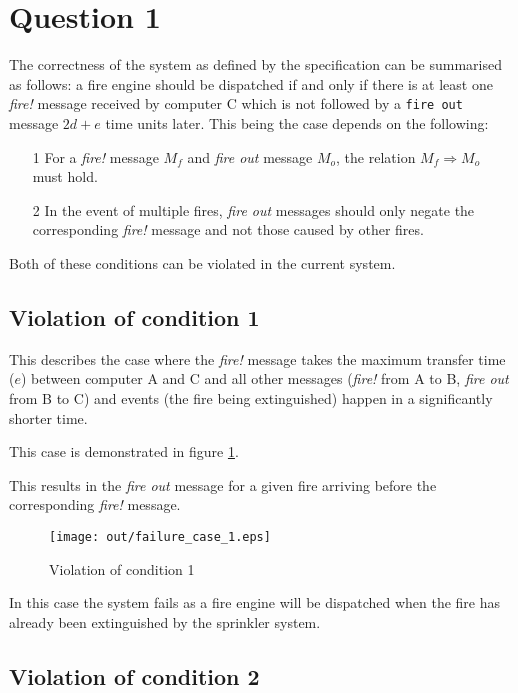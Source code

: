 \documentclass[twocolumn]{article}
\title{\DOCTITLE}
\author{\DOCAUTHOR}
\date{\DOCDATE}
\begin{document}
\section{Question 1}

The correctness of the system as defined by the specification can be summarised
as follows: a fire engine should be dispatched if and only if there is at least
one \textit{fire!} message received by computer C which is not followed by a
\texttt{fire out} message $2d + e$ time units later. This being the case depends
on the following:

\begin{enumerate}
  \item[1] For a \textit{fire!} message $M_{f}$ and \textit{fire out} message
           $M_{o}$, the relation $M_{f} \Rightarrow M_{o}$ must hold.
  \item[2] In the event of multiple fires, \textit{fire out} messages should
           only negate the corresponding \textit{fire!} message and not those
           caused by other fires.
\end{enumerate}

Both of these conditions can be violated in the current system.

\subsection{Violation of condition 1}

This describes the case where the \textit{fire!} message takes the maximum
transfer time ($e$) between computer A and C and all other messages
(\textit{fire!} from A to B, \textit{fire out} from B to C) and events (the fire
being extinguished) happen in a significantly shorter time.

This case is demonstrated in figure \ref{fig:failure_case_1}.

This results in the \textit{fire out} message for a given fire arriving before
the corresponding \textit{fire!} message.

\begin{figure}[h!]
  \centering
  \texttt{[image: out/failure\_case\_1.eps]}
  \caption{Violation of condition 1}
  \label{fig:failure_case_1}
\end{figure}

In this case the system fails as a fire engine will be dispatched when the fire
has already been extinguished by the sprinkler system.

\subsection{Violation of condition 2}
\end{document}
